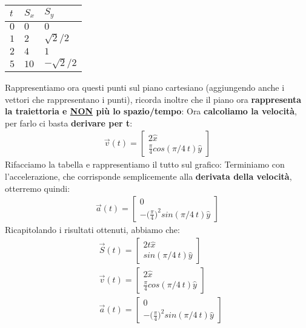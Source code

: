 				\begin{center}
					\begin{tabularx}{0.5\textwidth}{
						| >{\centering\arraybackslash}X
						| >{\centering\arraybackslash}X
						| >{\centering\arraybackslash}X | }
						\hline
						$t$ & $S_x$ & $S_y$\\
						\hline
						\hline
						$0$ & $0$ & $0$ \\
						$1$ & $2$ & $\sqrt{2}/2$ \\
						$2$ & $4$ & $1$ \\
						$5$ & $10$ & $-\sqrt{2}/2$ \\
						\hline
					\end{tabularx}
				\end{center}
				Rappresentiamo ora questi punti sul piano cartesiano (aggiungendo anche i vettori che rappresentano i punti), ricorda inoltre che il piano ora \textbf{rappresenta la traiettoria e \underline{NON} più lo spazio/tempo}:
				Ora \textbf{calcoliamo la velocità}, per farlo ci basta \textbf{derivare per t}:
				\begin{align*}
					\vec{v}(t) =
					\begin{bmatrix}
						2\hat{x}\\
						\frac{\pi}{4}cos(\pi/4\ t)\hat{y}
					\end{bmatrix}
				\end{align*}
				Rifacciamo la tabella e rappresentiamo il tutto sul grafico:
				Terminiamo con l'accelerazione, che corrisponde semplicemente alla \textbf{derivata della velocità}, otterremo quindi:
				\begin{align*}
					\vec{a}(t) =
					\begin{bmatrix}
						0\\
						-\big(\frac{\pi}{4}\big)^2sin(\pi/4\ t)\hat{y}
					\end{bmatrix}
				\end{align*}
				Ricapitolando i risultati ottenuti, abbiamo che:
				\begin{align*}
					&\vec{S}(t) =
					\begin{bmatrix}
						2t\hat{x}\\
						sin(\pi/4\ t)\hat{y}
					\end{bmatrix}\\
					&\vec{v}(t) =
					\begin{bmatrix}
						2\hat{x}\\
						\frac{\pi}{4}cos(\pi/4\ t)\hat{y}
					\end{bmatrix}\\
					&\vec{a}(t) =
					\begin{bmatrix}
						0\\
						-\big(\frac{\pi}{4}\big)^2sin(\pi/4\ t)\hat{y}
					\end{bmatrix}
				\end{align*}

